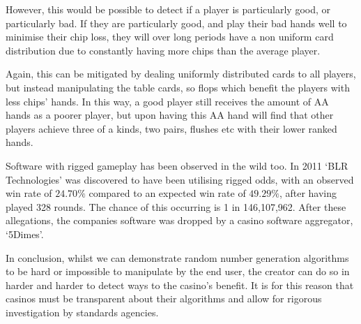However, this would be possible to detect if a player is particularly good, or
particularly bad. If they are particularly good, and play their bad hands well
to minimise their chip loss, they will over long periods have a non uniform
card distribution due to constantly having more chips than the average player.

Again, this can be mitigated by dealing uniformly distributed cards to all
players, but instead manipulating the table cards, so flops which benefit
the players with less chips' hands. In this way, a good player still receives
the amount of AA hands as a poorer player, but upon having this AA hand will
find that other players achieve three of a kinds, two pairs, flushes etc
with their lower ranked hands.

Software with rigged gameplay has been observed in the wild too. In 2011 
`BLR Technologies' was discovered to have been utilising rigged odds, with an 
observed win rate of $24.70\%$ compared to an expected win rate of $49.29\%$,
after having played 328 rounds. The chance of this occurring is 1 in 
146,107,962. \parencite{website:shackleford2011} After these allegations, 
the companies software was dropped by a casino software aggregator, `5Dimes'.

In conclusion, whilst we can demonstrate random number generation algorithms
to be hard or impossible to manipulate by the end user, the creator can do so
in harder and harder to detect ways to the casino's benefit. It is for this
reason that casinos must be transparent about their algorithms and allow
for rigorous investigation by standards agencies.

